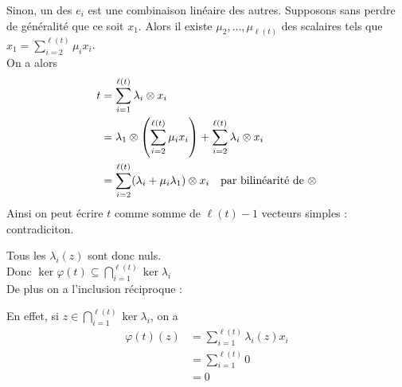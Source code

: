 \documentclass{article}
\def \r {{\ell(t)}}
\begin{document}
\begin{enumerate}[1., start=1]
        \par \setlength{\leftskip}{.2cm}
            Sinon, un des $e_i$ est une combinaison linéaire des autres. Supposons sans perdre de généralité que ce soit $x_1$. Alors il existe $\mu_2, \ldots, \mu_\r$ des scalaires tels que $x_1 = \sum_{i=2}^\r\mu_i x_i$.\\
            On a alors
            \begin{align*} t &= \sum_{i=1}^\r \lambda_i \otimes x_i \\
                &= \lambda_1\otimes\left(\sum_{i=2}^\r\mu_i x_i \right) + \sum_{i=2}^\r \lambda_i \otimes x_i \\
                &= \sum_{i=2}^\r (\lambda_i + \mu_i \lambda_1) \otimes x_i \text{\quad par bilinéarité de }\otimes
            \end{align*}
            Ainsi on peut écrire $t$ comme somme de $\r - 1$ vecteurs simples : contradiciton.

        \par \setlength{\leftskip}{0cm}
        Tous les $\lambda_i(z)$ sont donc nuls.\\
        Donc $\displaystyle\ker\varphi(t) \subseteq \bigcap_{i=1}^\r\ker\lambda_i$\\
        De plus on a l'inclusion réciproque :

        \par \setlength{\leftskip}{.2cm}
            En effet, si $z\in \bigcap_{i=1}^\r\ker\lambda_i$, on a
            \begin{align*}
                \varphi(t)(z) &= \sum_{i=1}^\r\lambda_i(z)x_i \\
                              &= \sum_{i=1}^\r 0 \\
                              &= 0
            \end{align*}


\end{enumerate}
\end{document}
